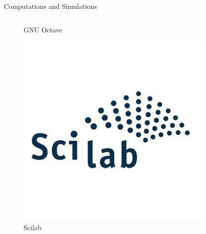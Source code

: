 \documentclass[10pt]{beamer}
\begin{document}
\begin{frame}{Computations and Simulations}
\begin{columns}
\begin{column}{0.5\textwidth}
\begin{figure}
                    \caption{GNU Octave}
                \end{figure}
                \begin{figure}
                    \includegraphics[height=0.2\paperheight]{images/scilab}
                    \caption{Scilab}
                \end{figure}
            \end{column}
        \end{columns}
    \end{frame}
\end{document}
